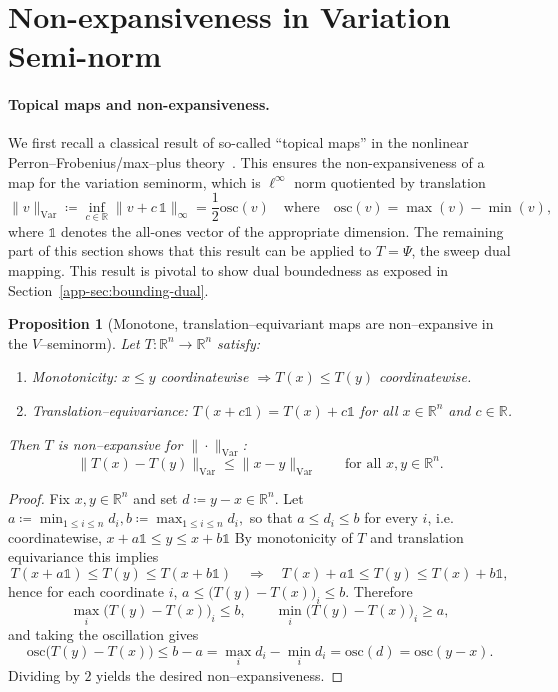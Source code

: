\documentclass{article}
\theoremstyle{plain}
\newtheorem{proposition}{Proposition}[section]
\newcommand{\ones}{\mathds{1}}
\newcommand{\eqdef}{\coloneqq}
\newcommand{\RR}{\mathbb{R}}
\newcommand{\norm}[1]{\|#1\|}
\newcommand{\normVar}[1]{\norm{#1}_{\mathrm{Var}}}
\begin{document}
\section{Non-expansiveness in Variation Semi-norm}
\label{app-sec:non-expansiveness}


\paragraph{Topical maps and non-expansiveness.}

We first recall a classical result of so-called ``topical maps'' in the nonlinear Perron--Frobenius/max--plus theory~\cite{candrall1980some}. This ensures the non-expansiveness of a map for the variation seminorm, which is $\ell^\infty$ norm quotiented by translation
\begin{equation}\label{app-eq:variation-seminorm}
	\normVar{v} \eqdef \inf_{c\in\RR}\|v+c\,\ones\|_\infty = 
	 \frac{1}{2} \mathrm{osc}(v)
	 \quad\text{where}\quad
	 \mathrm{osc}(v)=\max(v)-\min(v), 
\end{equation}
where $\ones$ denotes the all-ones vector of the appropriate dimension.
%
The remaining part of this section shows that this result can be applied to $T=\Psi$, the sweep dual mapping. This result is pivotal to show dual boundedness as exposed in Section~\ref{app-sec:bounding-dual}.

\begin{proposition}[Monotone, translation--equivariant maps are non--expansive in the $V$--seminorm]
\label{app-prop:topical-nonexpansive}
Let $T:\mathbb{R}^n\to\mathbb{R}^n$ satisfy:
\begin{enumerate}
\item \emph{Monotonicity:} $x\le y$ coordinatewise $\Rightarrow T(x)\le T(y)$ coordinatewise.
\item \emph{Translation--equivariance:} 
      $T(x+c \ones)=T(x)+c \ones$ for all $x\in\mathbb{R}^n$ and $c\in\mathbb{R}$.
\end{enumerate}
Then $T$ is non--expansive for $\normVar{\cdot}$:
\[
  \normVar{T(x)-T(y)} \le \normVar{x-y} \qquad\text{for all }x,y\in\mathbb{R}^n.
\]
\end{proposition}

\begin{proof}
Fix $x,y\in\mathbb{R}^n$ and set $d\eqdef y-x\in\mathbb{R}^n$. Let
$
  a \eqdef \min_{1\le i\le n} d_i,  b\eqdef \max_{1\le i\le n} d_i,
$
so that $a\le d_i\le b$ for every $i$, i.e. coordinatewise, 
$
  x+a \ones \le  y \le  x+b \ones
$
By monotonicity of $T$ and translation equivariance this implies
\[
  T(x+a \ones) \le  T(y) \le  T(x+b \ones)
  \quad\Rightarrow\quad
  T(x)+a \ones  \le  T(y)  \le  T(x)+b \ones,
\]
hence for each coordinate $i$,
$
  a  \le  \bigl(T(y)-T(x)\bigr)_i  \le  b .
$
Therefore
\[
  \max_i \bigl(T(y)-T(x)\bigr)_i  \le  b,
  \qquad
  \min_i \bigl(T(y)-T(x)\bigr)_i  \ge  a,
\]
and taking the oscillation gives
\[
  \mathrm{osc}\bigl(T(y)-T(x)\bigr)
   \le  b-a
  = \max_i d_i - \min_i d_i
  = \mathrm{osc}(d)
  = \mathrm{osc}(y-x).
\]
Dividing by $2$ yields the desired non--expansiveness.
\end{proof}
\end{document}
